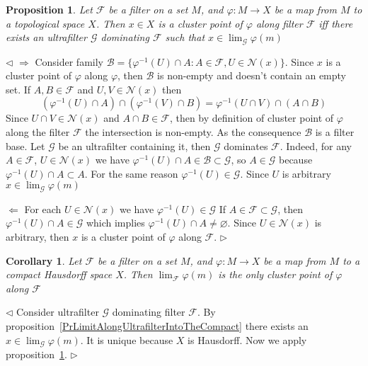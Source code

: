 \documentclass[12pt]{article}
\newtheorem{proposition}[theorem]{Proposition}
\newtheorem{corollary}[theorem]{Corollary}
\newenvironment{proof}{\par $\triangleleft$}{$\triangleright$}
\begin{document}
\begin{proposition}\label{PrClusterPointAlongTheFilterCriterion} Let
    $\mathcal{F}$ be a filter on  a set $M$, and $\varphi:M\to X$ be a map from
    $M$ to a topological space $X$. Then $x\in X$ is a cluster point of
    $\varphi$ along filter $\mathcal{F}$ iff there exists an ultrafilter
    $\mathcal{G}$ dominating $\mathcal{F}$ such that
    $x\in\lim_{\mathcal{G}}\varphi(m)$
\end{proposition}
\begin{proof} $\Longrightarrow$ Consider family
    $\mathcal{B}=\{\varphi^{-1}(U)\cap A: A\in\mathcal{F},
        U\in\mathcal{N}(x)\}$. Since $x$ is a cluster point of $\varphi$ along
    $\varphi$, then $\mathcal{B}$ is non-empty and doesn't contain an empty set.
    If $A,B\in\mathcal{F}$ and $U,V\in\mathcal{N}(x)$ then
    $$
        (\varphi^{-1}(U)\cap A)\cap(\varphi^{-1}(V)\cap B)
        =\varphi^{-1}(U\cap V)\cap (A\cap B)
    $$
    Since $U\cap V\in\mathcal{N}(x)$ and $A\cap B\in\mathcal{F}$, then by
    definition of  cluster point of $\varphi$ along the filter $\mathcal{F}$ the
    intersection is non-empty. As the consequence $\mathcal{B}$ is a filter
    base. Let $\mathcal{G}$ be an ultrafilter containing it, then $\mathcal{G}$
    dominates $\mathcal{F}$. Indeed, for any $A\in\mathcal{F}$,
    $U\in\mathcal{N}(x)$ we have $\varphi^{-1}(U)\cap
        A\in\mathcal{B}\subset\mathcal{G}$, so $A\in\mathcal{G}$ because
    $\varphi^{-1}(U)\cap A\subset A$. For the same reason
    $\varphi^{-1}(U)\in\mathcal{G}$. Since $U$ is arbitrary
    $x\in\lim_{\mathcal{G}}\varphi(m)$

    $\Longleftarrow$  For each $U\in\mathcal{N}(x)$ we have
    $\varphi^{-1}(U)\in\mathcal{G}$ If $A\in\mathcal{F}\subset \mathcal{G}$,
    then $\varphi^{-1}(U)\cap A\in\mathcal{G}$ which implies
    $\varphi^{-1}(U)\cap A\neq \varnothing$. Since $U\in\mathcal{N}(x)$ is
    arbitrary, then $x$ is a cluster point of $\varphi$ along $\mathcal{F}$.
\end{proof}

\begin{corollary}\label{CorClusterPintAreLimitsAlongUltrafilters} Let
    $\mathcal{F}$ be a filter on  a set $M$, and $\varphi:M\to X$ be a map from
    $M$ to a compact Hausdorff space $X$. Then $\lim_{\mathcal{F}} \varphi(m)$
    is the only cluster point of $\varphi$ along $\mathcal{F}$
\end{corollary}
\begin{proof} Consider ultrafilter $\mathcal{G}$ dominating filter
    $\mathcal{F}$. By proposition~\ref{PrLimitAlongUltrafilterIntoTheCompact}
    there exists an $x\in\lim_{\mathcal{G}}\varphi(m)$. It is unique because $X$
    is Hausdorff. Now we apply
    proposition~\ref{PrClusterPointAlongTheFilterCriterion}.
\end{proof}
\end{document}
